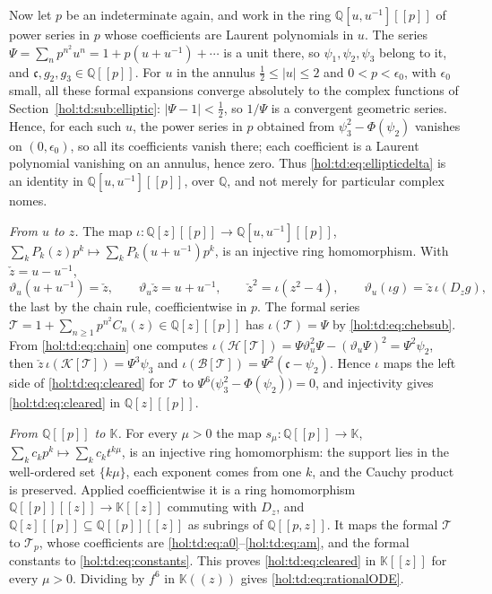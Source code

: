 \documentclass[11pt]{article}
\numberwithin{equation}{section}
\theoremstyle{definition}
\theoremstyle{remark}
\newcommand{\Q}{\mathbb Q}
\newcommand{\abs}[1]{\lvert#1\rvert}
\newcommand{\KK}{\mathbb K}
\begin{document}
Now let $p$ be an indeterminate again, and work in the ring $\Q[u,u^{-1}][[p]]$
of power series in $p$ whose coefficients are Laurent polynomials in $u$. The
series $\Psi=\sum_np^{n^2}u^n=1+p(u+u^{-1})+\cdots$ is a unit there, so
$\psi_1,\psi_2,\psi_3$ belong to it, and $\mathfrak c,g_2,g_3\in\Q[[p]]$. For
$u$ in the annulus $\frac12\le\abs u\le2$ and $0<p<\epsilon_0$, with
$\epsilon_0$ small, all these formal expansions converge absolutely to the
complex functions of Section~\ref{hol:td:sub:elliptic}: $\abs{\Psi-1}<\frac12$,
so $1/\Psi$ is a convergent geometric series. Hence, for each such $u$, the
power series in $p$ obtained from $\psi_3^2-\Phi(\psi_2)$ vanishes on
$(0,\epsilon_0)$, so all its coefficients vanish there; each coefficient is a
Laurent polynomial vanishing on an annulus, hence zero. Thus
\eqref{hol:td:eq:ellipticdelta} is an identity in $\Q[u,u^{-1}][[p]]$, over
$\Q$, and not merely for particular complex nomes.

\emph{From $u$ to $z$.} The map $\iota:\Q[z][[p]]\to\Q[u,u^{-1}][[p]]$,
$\sum_kP_k(z)p^k\mapsto\sum_kP_k(u+u^{-1})p^k$, is an injective ring
homomorphism. With $\check z=u-u^{-1}$,
\begin{equation}\label{hol:td:eq:chain}
 \vartheta_u(u+u^{-1})=\check z,\qquad \vartheta_u\check z=u+u^{-1},\qquad
 \check z^2=\iota(z^2-4),\qquad \vartheta_u(\iota g)=\check z\,\iota(D_zg),
\end{equation}
the last by the chain rule, coefficientwise in $p$. The formal series
$\mathcal T=1+\sum_{n\ge1}p^{n^2}C_n(z)\in\Q[z][[p]]$ has $\iota(\mathcal
T)=\Psi$ by \eqref{hol:td:eq:chebsub}. From \eqref{hol:td:eq:chain} one
computes $\iota(\mathcal H[\mathcal T])=\Psi\vartheta_u^2\Psi-(\vartheta_u\Psi)^2
=\Psi^2\psi_2$, then $\check z\,\iota(\mathcal K[\mathcal T])=\Psi^3\psi_3$
and $\iota(\mathcal B[\mathcal T])=\Psi^2(\mathfrak c-\psi_2)$. Hence
$\iota$ maps the left side of \eqref{hol:td:eq:cleared} for $\mathcal T$ to
$\Psi^6\bigl(\psi_3^2-\Phi(\psi_2)\bigr)=0$, and injectivity gives
\eqref{hol:td:eq:cleared} in $\Q[z][[p]]$.

\emph{From $\Q[[p]]$ to $\KK$.} For every $\mu>0$ the map
$s_\mu:\Q[[p]]\to\KK$, $\sum_kc_kp^k\mapsto\sum_kc_kt^{k\mu}$, is an injective
ring homomorphism: the support lies in the well-ordered set $\{k\mu\}$, each
exponent comes from one $k$, and the Cauchy product is preserved. Applied
coefficientwise it is a ring homomorphism $\Q[[p]][[z]]\to\KK[[z]]$ commuting
with $D_z$, and $\Q[z][[p]]\subseteq\Q[[p]][[z]]$ as subrings of $\Q[[p,z]]$.
It maps the formal $\mathcal T$ to $\mathcal T_p$, whose coefficients are
\eqref{hol:td:eq:a0}--\eqref{hol:td:eq:am}, and the formal constants to
\eqref{hol:td:eq:constants}. This proves \eqref{hol:td:eq:cleared} in
$\KK[[z]]$ for every $\mu>0$. Dividing by $f^6$ in $\KK((z))$ gives
\eqref{hol:td:eq:rationalODE}.
\end{document}
